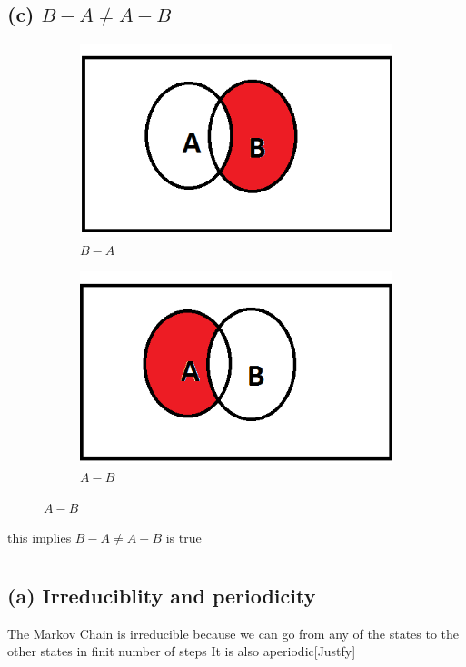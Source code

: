 \documentclass[a4paper,11pt]{article}
\begin{document}
\subsection*{(c) $B-A \neq A-B$}
\begin{figure}[h]
    \centering
    \begin{subfigure}[b]{0.35\textwidth}
        \includegraphics[width=\textwidth]{B-A}
        \caption{$B-A$}
    \end{subfigure}
    \begin{subfigure}[b]{0.35\textwidth}
        \includegraphics[width=\textwidth]{A-B}
        \caption{$ A-B$}
    \end{subfigure}
\end{figure}
this implies $B-A \neq A-B$ is true
\newpage
\section{}
\subsection*{(a) Irreduciblity and periodicity }
The Markov Chain is irreducible because we can go from any of the states to the other states in finit number of steps
It is also aperiodic[Justfy]
\end{document}
